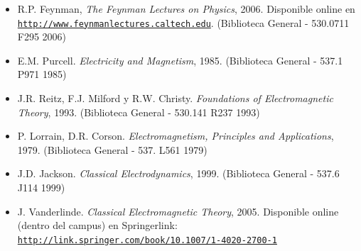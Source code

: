 \documentclass[letterpaper,10pt,onecolumn]{article}
\begin{document}
\begin{itemize}
	\item R.P. Feynman, \textit{The Feynman Lectures on Physics},
          2006. Disponible online en
          \href{http://www.feynmanlectures.caltech.edu}{\nolinkurl{http://www.feynmanlectures.caltech.edu}}. (Biblioteca
          General - 530.0711 F295 2006)\\[-0.6cm] 
	\item E.M. Purcell. \textit{Electricity and Magnetism},
          1985. (Biblioteca General - 537.1 P971 1985)\\[-0.6cm] 
	\item J.R. Reitz, F.J. Milford y
          R.W. Christy. \textit{Foundations of Electromagnetic
            Theory}, 1993. (Biblioteca General - 530.141 R237
          1993)\\[-0.6cm] 
	\item P. Lorrain, D.R. Corson. \textit{Electromagnetism,
          Principles and Applications}, 1979. (Biblioteca General -
          537. L561 1979)\\[-0.6cm] 
	\item J.D. Jackson. \textit{Classical Electrodynamics},
          1999. (Biblioteca General - 537.6 J114 1999)\\[-0.6cm] 
	\item J. Vanderlinde. \textit{Classical Electromagnetic Theory}, 2005. Disponible online (dentro del campus) en Springerlink:\\
	\href{http://link.springer.com/book/10.1007/1-4020-2700-1}{\nolinkurl{http://link.springer.com/book/10.1007/1-4020-2700-1}} 
\end{itemize}
\end{document}
